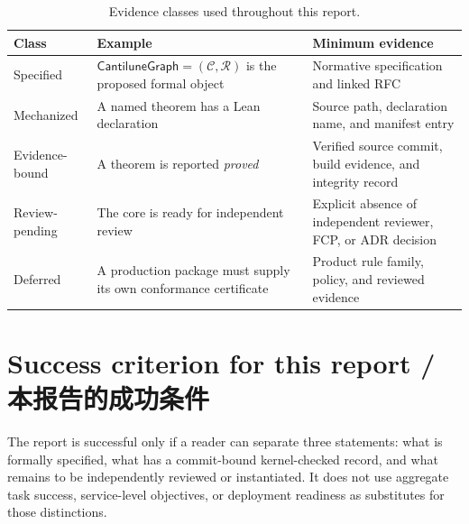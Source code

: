 \begin{table}[H]
\centering
\caption{Evidence classes used throughout this report.}
\label{tab:claim-taxonomy}
\begin{tabularx}{\textwidth}{@{}L{0.19\textwidth}L{0.28\textwidth}Y@{}}
\toprule
{}
\textbf{Class} & \textbf{Example} & \textbf{Minimum evidence} \\
\midrule
Specified & \(\mathsf{CantiluneGraph}=(\mathcal C,\mathcal R)\) is the proposed formal object & Normative specification and linked RFC \\
Mechanized & A named theorem has a Lean declaration & Source path, declaration name, and manifest entry \\
Evidence-bound & A theorem is reported \emph{proved} & Verified source commit, build evidence, and integrity record \\
Review-pending & The core is ready for independent review & Explicit absence of independent reviewer, FCP, or ADR decision \\
Deferred & A production package must supply its own conformance certificate & Product rule family, policy, and reviewed evidence \\
\bottomrule
\end{tabularx}
\end{table}

\section{Success criterion for this report / 本报告的成功条件}

The report is successful only if a reader can separate three statements: what is formally
specified, what has a commit-bound kernel-checked record, and what remains to be independently
reviewed or instantiated. It does not use aggregate task success, service-level objectives, or
deployment readiness as substitutes for those distinctions.
